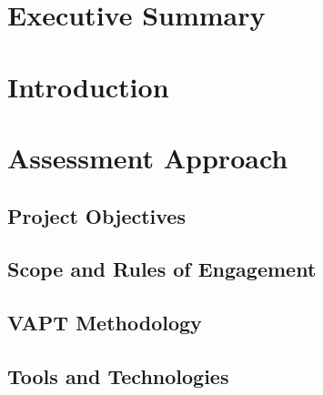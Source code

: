 \documentclass[11pt,a4paper]{report}
\begin{document}

\tableofcontents

\clearpage



\chapter{Executive Summary}
\label{chap:executive-summary}


\chapter{Introduction}
\label{chap:introduction}



\chapter{Assessment Approach}
\label{chap:assessment-approach}

\section{Project Objectives}


\section{Scope and Rules of Engagement}


\section{VAPT Methodology}


\section{Tools and Technologies}


\end{document}
